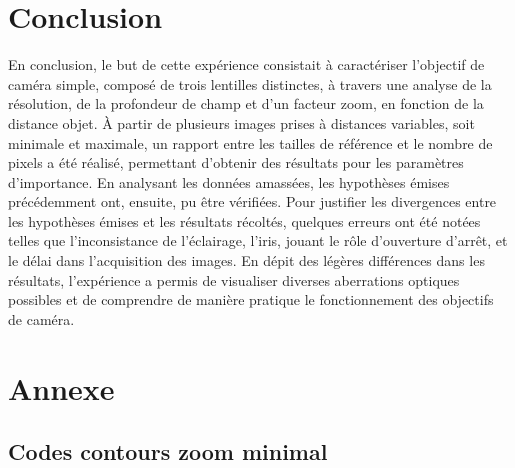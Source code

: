 \documentclass[11pt,letterpaper]{article}
\begin{document}



\section{Conclusion}
En conclusion, le but de cette expérience consistait à caractériser l'objectif de caméra simple, composé de trois lentilles distinctes, à travers une analyse de la résolution, de la profondeur de champ et d'un facteur zoom, en fonction de la distance objet. À partir de plusieurs images prises à distances variables, soit minimale et maximale, un rapport entre les tailles de référence et le nombre de pixels a été réalisé, permettant d'obtenir des résultats pour les paramètres d'importance. En analysant les données amassées, les hypothèses émises précédemment ont, ensuite, pu être vérifiées. Pour justifier les divergences entre les hypothèses émises et les résultats récoltés, quelques erreurs ont été notées telles que l'inconsistance de l'éclairage, l'iris, jouant le rôle d'ouverture d'arrêt, et le délai dans l'acquisition des images. En dépit des légères différences dans les résultats, l'expérience a permis de visualiser diverses aberrations optiques possibles et de comprendre de manière pratique le fonctionnement des objectifs de caméra.


\clearpage
\section{Annexe}
\subsection{Codes contours zoom minimal}
\end{document}
